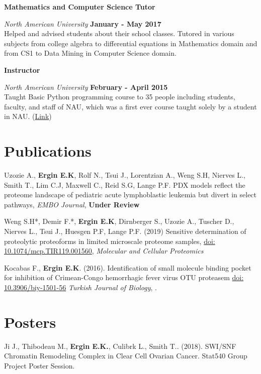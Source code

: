 \documentclass[margin,line]{res}
\begin{document}
\begin{resume}
{\bf Mathematics and Computer Science Tutor}
\vspace{-.1cm}

{\em North American University} \hfill {\bf January - May 2017}\\
Helped and advised students about their school classes. Tutored in various subjects from college algebra to differential equations in Mathematics domain and from CS1 to Data Mining in Computer Science domain.

{\bf Instructor}
\vspace{-.1cm}

{\em North American University} \hfill {\bf February - April 2015}\\
Taught Basic Python programming course to 35 people including students, faculty, and staff of NAU, which was a first ever course taught solely by a student in NAU. (\href{https://github.com/NAU-Python-Class/Py101-Spring-15}{Link})


\section{\sc Publications}
Uzozie A., {\bf Ergin E.K}, Rolf N., Tsui J., Lorentzian A., Weng S.H,  Nierves L., Smith T., Lim C.J,  Maxwell C., Reid S.G, Lange P.F. PDX models reflect the proteome landscape of pediatric acute lymphoblastic leukemia but divert in select pathways, {\em EMBO Journal},  {\bf Under Review}

Weng S.H*, Demir F.*, {\bf Ergin E.K}, Dirnberger S., Uzozie A., Tuscher D., Nierves L., Tsui J., Huesgen P.F, Lange P.F. (2019) Sensitive determination of proteolytic proteoforms in limited microscale proteome samples, \href{https://doi.org/10.1074/mcp.TIR119.001560}{doi: 10.1074/mcp.TIR119.001560}, {\em Molecular and Cellular Proteomics}

Kocabas F., {\bf Ergin E.K}. (2016). Identification of small molecule binding pocket for inhibition of Crimean-Congo hemorrhagic fever virus OTU proteasem \href{https://www.researchgate.net/profile/Fatih_Kocabas/publication/284188739_Identification_of_small_molecule_binding_pocket_for_inhibition_of_Crimean-Congo_hemorrhagic_fever_virus_OTU_protease/links/564f6a0b08aefe619b11de98.pdf}{doi: 10.3906/biy-1501-56} {\em Turkish Journal of Biology}, .

\section{\sc Posters}
Ji J., Thibodeau M., {\bf Ergin E.K.}, Culibrk L., Smith T.. (2018). SWI/SNF Chromatin Remodeling Complex in Clear Cell Ovarian Cancer. Stat540 Group Project Poster Session.


\end{resume}
\end{document}
